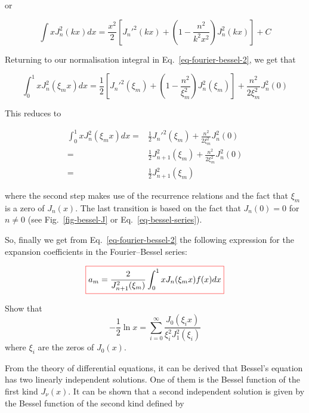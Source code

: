 or

\begin{equation}
\int x J_n^2(k x) dx = \frac{x^2}{2}\left[{J_n'^2(kx) + \left(1 - \frac{n^2}{k^2x^2}\right) J_n^2(kx)}\right] + C
\end{equation} 

Returning to our normalisation integral in Eq.~\ref{eq-fourier-bessel-2}, we get that

\begin{equation}
\int_0^1 x J_n^2(\xi_m x) dx = \frac{1}{2}\left[{J_n'^2(\xi_m) + \left(1 - \frac{n^2}{\xi_m^2}\right) J_n^2(\xi_m)}\right] + \frac{n^2}{2\xi_m^2} J_n^2(0)
\end{equation} 

This reduces to

\begin{align}
\int_0^1 x J_n^2(\xi_m x) dx =& \frac{1}{2}J_n'^2(\xi_m) + \frac{n^2}{2\xi_m^2} J_n^2(0) \nonumber \\
 =& \frac{1}{2}J_{n+1}^2(\xi_m) + \frac{n^2}{2\xi_m^2} J_n^2(0) \nonumber \\
 =& \frac{1}{2}J_{n+1}^2(\xi_m)
\end{align} 

where the second step makes use of the recurrence relations and the fact that $\xi_m$ is a zero of $J_n(x)$. The last transition is based on the fact that $J_n(0)=0$ for $n \ne 0$ (see Fig.~\ref{fig-bessel-J} or Eq.~\ref{eq-bessel-series}).

So, finally we get from Eq.~\ref{eq-fourier-bessel-2} the following expression for the expansion coefficients in the Fourier--Bessel series:

\begin{equation}
\fbox{$\displaystyle
a_m = \frac{2}{J_{n+1}^2(\xi_m)}\int_0^1 x J_n(\xi_m x) f(x) dx
$}
\end{equation} 

\begin{sidebar}
\begin{ex}
Show that
$$-\frac{1}{2} \ln x = \sum_{i=0}^{\infty} \frac{J_0(\xi_i x)}{\xi_i^2 J_1^2(\xi_i)}$$
where $\xi_i$ are the zeros of $J_0(x)$.
\end{ex}
\end{sidebar}


From the theory of differential equations, it can be derived that Bessel's equation has two linearly independent solutions. One of them is the Bessel function of the first kind $J_\nu(x)$. It can be shown that a second independent solution is given by the Bessel function of the second kind defined by

